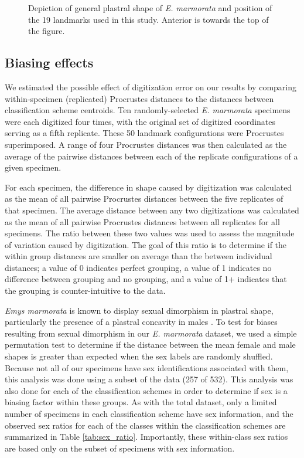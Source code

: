 \documentclass[10pt,letterpaper]{article}
\begin{document}
\begin{figure}[ht]
  \centering
  \caption{Depiction of general plastral shape of \textit{E. marmorata} and position of the 19 landmarks used in this study. Anterior is towards the top of the figure.}
  \label{fig:plastra}
\end{figure}

\subsection*{Biasing effects}
We estimated the possible effect of digitization error \cite{Arnqvist1998,Cramon2007,Munoz-MunozF.2010} on our results by comparing within-specimen (replicated) Procrustes distances to the distances between classification scheme centroids. Ten randomly-selected \textit{E. marmorata} specimens were each digitized four times, with the original set of digitized coordinates serving as a fifth replicate. These 50 landmark configurations were Procrustes superimposed. A range of four Procrustes distances was then calculated as the average of the pairwise distances between each of the replicate configurations of a given specimen.

For each specimen, the difference in shape caused by digitization was calculated as the mean of all pairwise Procrustes distances between the five replicates of that specimen. The average distance between any two digitizations was calculated as the mean of all pairwise Procrustes distances between all replicates for all specimens. The ratio between these two values was used to assess the magnitude of variation caused by digitization. The goal of this ratio is to determine if the within group distances are smaller on average than the between individual distances; a value of 0 indicates perfect grouping, a value of 1 indicates no difference between grouping and no grouping, and a value of 1+ indicates that the grouping is counter-intuitive to the data.

\textit{Emys marmorata} is known to display sexual dimorphism in plastral shape, particularly the presence of a plastral concavity in males \cite{Seeliger1945}. To test for biases resulting from sexual dimorphism in our \textit{E. marmorata} dataset, we used a simple permutation test to determine if the distance between the mean female and male shapes is greater than expected when the sex labels are randomly shuffled. Because not all of our specimens have sex identifications associated with them, this analysis was done using a subset of the data (257 of 532). This analysis was also done for each of the classification schemes in order to determine if sex is a biasing factor within these groups. As with the total dataset, only a limited number of specimens in each classification scheme have sex information, and the observed sex ratios for each of the classes within the classification schemes are summarized in Table \ref{tab:sex_ratio}. Importantly, these within-class sex ratios are based only on the subset of specimens with sex information.
\end{document}

